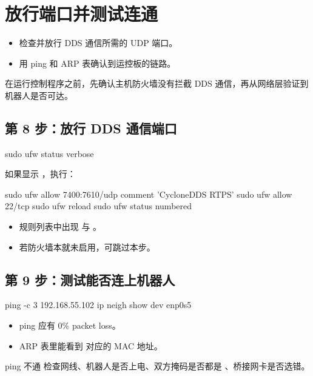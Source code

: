 \chapter{放行端口并测试连通}
\label{chap:firewall}
\begin{intro}
\begin{itemize}
\item 检查并放行 DDS 通信所需的 UDP 端口。
\item 用 ping 和 ARP 表确认到运控板的链路。
\end{itemize}
\end{intro}
在运行控制程序之前，先确认主机防火墙没有拦截 DDS 通信，再从网络层验证到机器人是否可达。

\section{第 8 步：放行 DDS 通信端口}
\label{step:8}
\begin{command}
sudo ufw status verbose
\end{command}

如果显示 ，执行：

\begin{command}
sudo ufw allow 7400:7610/udp comment 'CycloneDDS RTPS'
sudo ufw allow 22/tcp
sudo ufw reload
sudo ufw status numbered
\end{command}

\begin{expected}
\begin{itemize}
\item 规则列表中出现  与 。
\item 若防火墙本就未启用，可跳过本步。
\end{itemize}
\end{expected}

\section{第 9 步：测试能否连上机器人}
\label{step:9}
\begin{command}
ping -c 3 192.168.55.102
ip neigh show dev enp0s5
\end{command}

\begin{expected}
\begin{itemize}
\item ping 应有 0\% packet loss。
\item ARP 表里能看到  对应的 MAC 地址。
\end{itemize}
\end{expected}

\begin{faq}{ping 不通}
检查网线、机器人是否上电、双方掩码是否都是 、桥接网卡是否选错。
\end{faq}
